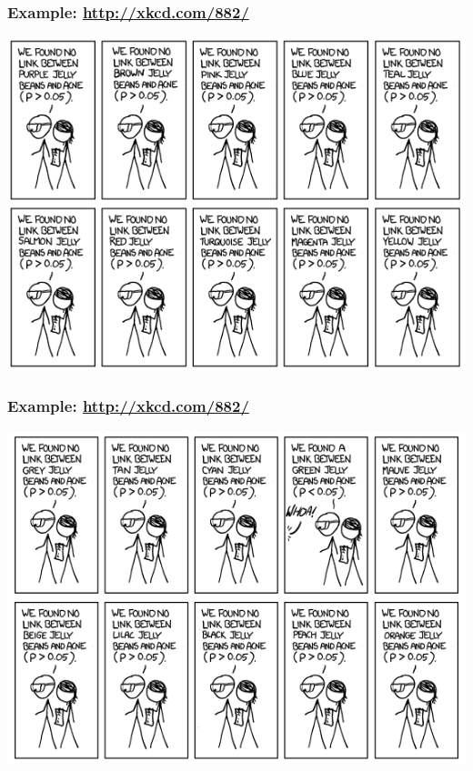 \documentclass[handout]{beamer}\usepackage[]{graphicx}\usepackage[]{color}
\numberwithin{equation}{section}
\begin{document}
\begin{frame}
\frametitle{Example: \url{http://xkcd.com/882/}}
 \includegraphics{../../fig/xkcd2.png}
\end{frame}

\begin{frame}
\frametitle{Example: \url{http://xkcd.com/882/}}
 \includegraphics{../../fig/xkcd3.png}
\end{frame}
\end{document}
